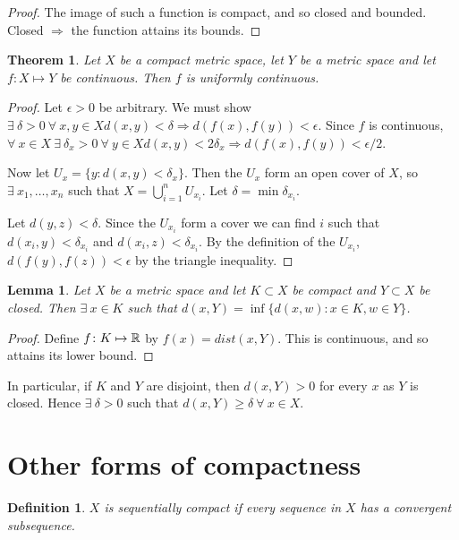 \documentclass{notes}
\theoremstyle{plain}
\newtheorem{theorem}[proposition]{Theorem}
\newtheorem{definition}[proposition]{Definition}
\newtheorem{lemma}[proposition]{Lemma}
\begin{document}
\begin{proof}
The image of such a function is compact, and so closed and bounded.  Closed
$\Rightarrow$ the function attains its bounds.
\end{proof}

\begin{theorem}
Let $X$ be a compact metric space, let $Y$ be a metric space and let
$f \colon X \mapsto Y$ be continuous.  Then $f$ is uniformly continuous.
\end{theorem}

\begin{proof}
Let $\epsilon > 0$ be arbitrary.  We must show $\exists\ \delta > 0\ 
\forall\ x,y \in X d(x,y) < \delta \Rightarrow d(f(x),f(y)) < \epsilon$.
Since $f$ is continuous, $\forall\ x \in X\  \exists\ \delta_x > 0\ \forall\ y
\in X d(x,y) < 2 \delta_x \Rightarrow d(f(x),f(y)) < \epsilon/2$.

Now let $U_x = \{ y : d(x,y) < \delta_x \}$.  Then the $U_x$ form an open cover
of $X$, so $\exists\ x_1, \dots, x_n$ such that
$X = \bigcup_{i=1}^n U_{x_i}$.  Let $\delta = \min \delta_{x_i}$.

Let $d(y,z) < \delta$.  Since the $U_{x_i}$ form a cover we can find $i$ such
that $d(x_i,y) < \delta_{x_i}$ and $d(x_i,z) < \delta_{x_i}$.  By the
definition of the $U_{x_i}$, $d(f(y),f(z)) < \epsilon$ by the triangle
inequality.
\end{proof}

\begin{lemma}
Let $X$ be a metric space and let $K \subset X$ be compact and $Y \subset X$
be closed.  Then $\exists\ x \in K$ such that $d(x,Y) = \inf \{ d(x,w) :
x \in K, w \in Y \}$.
\end{lemma}

\begin{proof}
Define $f \colon K \mapsto \mathbb{R}$ by $f(x) = dist(x,Y)$.  This is continuous, and so
attains its lower bound.
\end{proof}

In particular, if $K$ and $Y$ are disjoint, then $d(x,Y) > 0$ for every $x$
as $Y$ is closed. Hence $\exists\ \delta > 0$ such that $d(x,Y) \ge \delta\
\forall\ x \in X$.

\section{Other forms of compactness}

\begin{definition}
$X$ is sequentially compact
if every sequence in $X$ has a convergent subsequence.
\end{definition}
\end{document}
